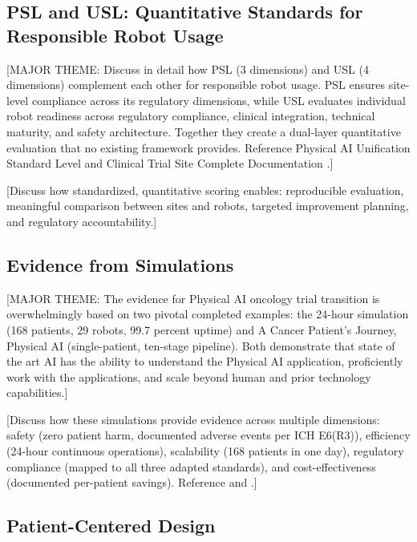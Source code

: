 \subsection{PSL and USL: Quantitative Standards for Responsible Robot Usage}
\label{subsec:discuss-standards}

[MAJOR THEME: Discuss in detail how PSL (3 dimensions) and USL (4 dimensions)
complement each other for responsible robot usage. PSL ensures site-level
compliance across its regulatory dimensions, while USL evaluates individual
robot readiness across regulatory compliance, clinical integration, technical
maturity, and safety architecture. Together they create a dual-layer
quantitative evaluation that no existing framework provides. Reference Physical
AI Unification Standard Level \cite{usl-standard} and Clinical Trial Site
Complete Documentation \cite{site-docs}.]

[Discuss how standardized, quantitative scoring enables: reproducible
evaluation, meaningful comparison between sites and robots, targeted
improvement planning, and regulatory accountability.]

\subsection{Evidence from Simulations}
\label{subsec:discuss-evidence}

[MAJOR THEME: The evidence for Physical AI oncology trial transition is
overwhelmingly based on two pivotal completed examples: the 24-hour simulation
(168 patients, 29 robots, 99.7 percent uptime) and A Cancer Patient's Journey,
Physical AI (single-patient, ten-stage pipeline). Both demonstrate that state
of the art AI has the ability to understand the Physical AI application,
proficiently work with the applications, and scale beyond human and prior
technology capabilities.]

[Discuss how these simulations provide evidence across multiple dimensions:
safety (zero patient harm, documented adverse events per ICH E6(R3)),
efficiency (24-hour continuous operations), scalability (168 patients in one
day), regulatory compliance (mapped to all three adapted standards), and
cost-effectiveness (documented per-patient savings). Reference
\cite{patient-journey-paper} and \cite{site-docs}.]

\subsection{Patient-Centered Design}
\label{subsec:discuss-patient}

